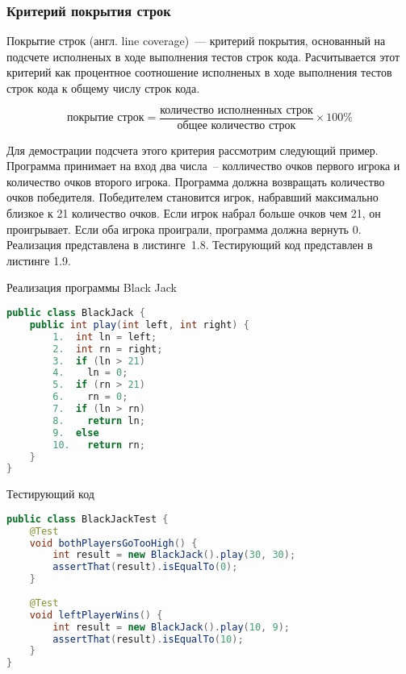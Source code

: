 \subsubsection{Критерий покрытия строк}

Покрытие строк (англ. line coverage)~--- критерий покрытия, основанный на подсчете исполненых в ходе выполнения тестов строк кода. Расчитывается этот критерий как процентное соотношение исполненых в ходе выполнения тестов строк кода к общему числу строк кода.

\[ \text{покрытие строк} = \frac{\text{количество исполненных строк}}{\text{общее количество строк}}  \times 100 \% \]

Для демострации подсчета этого критерия рассмотрим следующий пример. Программа принимает на вход два числа~-- колличество очков первого игрока и количество очков второго игрока. Программа должна возвращать количество очков победителя. Победителем становится игрок, набравший максимально близкое к 21 количество очков. Если игрок набрал больше очков чем 21, он проигрывает. Если оба игрока проиграли, программа должна вернуть 0. Реализация представлена в листинге~1.8. Тестирующий код представлен в листинге 1.9.

\begin{ListingEnv}[!h]%
	\captiondelim{ } %
	\caption{Реализация программы Black Jack}
	\begin{lstlisting}[language={Java}]
public class BlackJack {
	public int play(int left, int right) {
		1.  int ln = left;
		2.  int rn = right;
		3.  if (ln > 21)
		4.    ln = 0;
		5.  if (rn > 21)
		6.    rn = 0;
		7.  if (ln > rn)
		8.    return ln;
		9.  else
		10.   return rn;
	}
}
	\end{lstlisting}
\end{ListingEnv}%

\begin{ListingEnv}[!h]%
	\captiondelim{ } %
	\caption{Тестирующий код}
	\begin{lstlisting}[language={Java}]
public class BlackJackTest {
	@Test
	void bothPlayersGoTooHigh() {
		int result = new BlackJack().play(30, 30);
		assertThat(result).isEqualTo(0);
	}
	
	@Test
	void leftPlayerWins() {
		int result = new BlackJack().play(10, 9);
		assertThat(result).isEqualTo(10);
	}
}
	\end{lstlisting}
\end{ListingEnv}%

